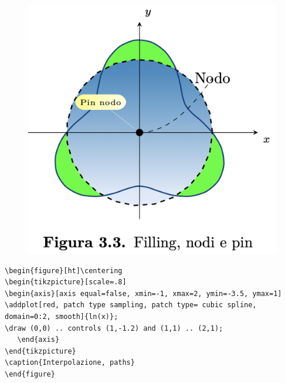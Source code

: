 \begin{figure}[ht]\centering
\includegraphics[scale=.5]{FileAusiliari/Screenshots/Figura3-3.png}
\end{figure}

\newpage
\begin{verbatim}
\begin{figure}[ht]\centering
\begin{tikzpicture}[scale=.8]
\begin{axis}[axis equal=false, xmin=-1, xmax=2, ymin=-3.5, ymax=1]
\addplot[red, patch type sampling, patch type= cubic spline, domain=0:2, smooth]{ln(x)};
\draw (0,0) .. controls (1,-1.2) and (1,1) .. (2,1);
   \end{axis}
\end{tikzpicture}
\caption{Interpolazione, paths}
\end{figure}
\end{verbatim}


